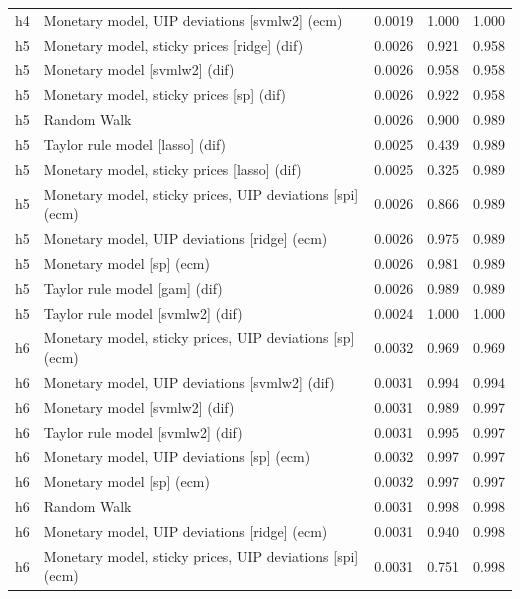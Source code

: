 \begin{ThreePartTable}
\begin{longtable}[t]{cp{5.5cm}ccc}
h4 & \raggedright Monetary model, UIP deviations [svmlw2] (ecm) & 0.0019 & 1.000 & 1.000\\
\addlinespace
h5 & \raggedright Monetary model, sticky prices [ridge] (dif) & 0.0026 & 0.921 & 0.958\\
h5 & \raggedright Monetary model [svmlw2] (dif) & 0.0026 & 0.958 & 0.958\\
h5 & \raggedright Monetary model, sticky prices [sp] (dif) & 0.0026 & 0.922 & 0.958\\
h5 & \raggedright Random Walk & 0.0026 & 0.900 & 0.989\\
h5 & \raggedright Taylor rule model [lasso] (dif) & 0.0025 & 0.439 & 0.989\\
h5 & \raggedright Monetary model, sticky prices [lasso] (dif) & 0.0025 & 0.325 & 0.989\\
h5 & \raggedright Monetary model, sticky prices, UIP deviations [spi] (ecm) & 0.0026 & 0.866 & 0.989\\
h5 & \raggedright Monetary model, UIP deviations [ridge] (ecm) & 0.0026 & 0.975 & 0.989\\
h5 & \raggedright Monetary model [sp] (ecm) & 0.0026 & 0.981 & 0.989\\
h5 & \raggedright Taylor rule model [gam] (dif) & 0.0026 & 0.989 & 0.989\\
h5 & \raggedright Taylor rule model [svmlw2] (dif) & 0.0024 & 1.000 & 1.000\\
\addlinespace
h6 & \raggedright Monetary model, sticky prices, UIP deviations [sp] (ecm) & 0.0032 & 0.969 & 0.969\\
h6 & \raggedright Monetary model, UIP deviations [svmlw2] (dif) & 0.0031 & 0.994 & 0.994\\
h6 & \raggedright Monetary model [svmlw2] (dif) & 0.0031 & 0.989 & 0.997\\
h6 & \raggedright Taylor rule model [svmlw2] (dif) & 0.0031 & 0.995 & 0.997\\
h6 & \raggedright Monetary model, UIP deviations [sp] (ecm) & 0.0032 & 0.997 & 0.997\\
h6 & \raggedright Monetary model [sp] (ecm) & 0.0032 & 0.997 & 0.997\\
h6 & \raggedright Random Walk & 0.0031 & 0.998 & 0.998\\
h6 & \raggedright Monetary model, UIP deviations [ridge] (ecm) & 0.0031 & 0.940 & 0.998\\
h6 & \raggedright Monetary model, sticky prices, UIP deviations [spi] (ecm) & 0.0031 & 0.751 & 0.998\\

\end{longtable}
\end{ThreePartTable}
